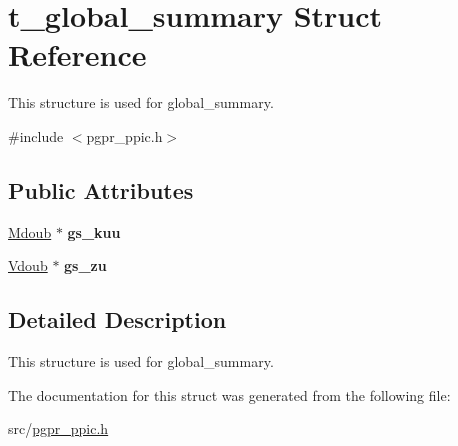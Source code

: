 \hypertarget{structt__global__summary}{\section{t\-\_\-global\-\_\-summary Struct Reference}
\label{structt__global__summary}
}


This structure is used for global\-\_\-summary.  




{\ttfamily \#include $<$pgpr\-\_\-ppic.\-h$>$}

\subsection*{Public Attributes}
\begin{DoxyCompactItemize}
\item 
\hypertarget{structt__global__summary_a1e5de710a9a5f62402b03070b84268a7}{\hyperlink{classpgpr__matrix}{Mdoub} $\ast$ {\bfseries gs\-\_\-kuu}}\label{structt__global__summary_a1e5de710a9a5f62402b03070b84268a7}

\item 
\hypertarget{structt__global__summary_ae0a0cb86f74d014c815e9060c4eaa4d8}{\hyperlink{classpgpr__vector}{Vdoub} $\ast$ {\bfseries gs\-\_\-zu}}\label{structt__global__summary_ae0a0cb86f74d014c815e9060c4eaa4d8}

\end{DoxyCompactItemize}


\subsection{Detailed Description}
This structure is used for global\-\_\-summary. 

The documentation for this struct was generated from the following file\-:\begin{DoxyCompactItemize}
\item 
src/\hyperlink{pgpr__ppic_8h}{pgpr\-\_\-ppic.\-h}\end{DoxyCompactItemize}
